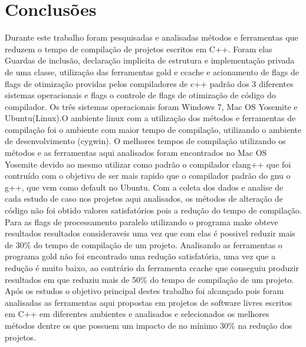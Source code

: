 \section{Conclusões}
	Durante este trabalho foram pesquisadas e analisadas métodos e ferramentas que reduzem
 o tempo de compilação de projetos escritos em C++. Foram elas Guardas de inclusão,
 declaração implicita de estrutura e implementação privada de uma classe,  utilização das
 ferramentas gold e ccache e acionamento de flags de flags de otimização providas pelos
 compiladores de c++ padrão dos 3  diferentes sistemas operacionais e flags o controle de
 flags de otimização de código do compilador.
	Os três sistemas operacionais foram Windows 7, Mac OS Yosemite e Ubuntu(Linux).O ambiente
 linux com a utilização dos métodos e ferramentas de compilação foi o ambiente com maior
 tempo de compilação, utilizando o ambiente de desenvolvimento (cygwin). O melhores tempos de
 compilação utilizando os métodos e as ferramentas aqui analisados foram encontrados no
 Mac OS Yosemite devido ao mesmo utilizar como padrão o compilador clang++ que foi
 contruído com o objetivo de ser mais rapido que o compilador padrão do gnu o g++, que vem
 como default no Ubuntu.
    Com a coleta dos dados e analise de cada estudo de caso nos projetos aqui analisados,
 os métodos de alteração de código não foi obtido valores satisfatórios pois a redução do
 tempo de compilação. Para as flags de processamento paralelo utilizando o programa make
 obteve resultados resultados consideraveis uma vez que com elas é possivel reduzir mais
 de 30\% do tempo de compilação de um projeto. Analisando as ferramentas o programa gold
 não foi encontrado uma redução satisfatória, uma vez que a redução é muito baixo, ao
 contrário da ferramenta ccache que conseguiu produzir resultados em que reduziu mais
 de 50\% do tempo de compilação de um projeto.
	Após os estudos o objetivo principal destes trabalho foi alcançado pois foram
 analisadas as ferramentas aqui propostas em projetos de software livres escritos em C++ 
em diferentes ambientes e analisados e selecionados os melhores métodos dentre os que possuem
um impacto de no mínimo 30\% na redução dos projetos.
